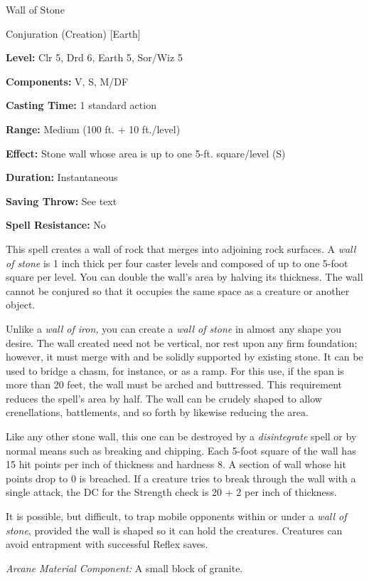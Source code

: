 \documentclass{article}
\begin{document}
\vspace{12pt}
Wall of Stone

Conjuration (Creation) [Earth]

\textbf{Level:} Clr 5, Drd 6, Earth 5, Sor/Wiz 5

\textbf{Components:} V, S, M/DF

\textbf{Casting Time:} 1 standard action

\textbf{Range: }Medium (100 ft. + 10 ft./level)

\textbf{Effect:} Stone wall whose area is up to one 5-ft. square/level (S)

\textbf{Duration:} Instantaneous

\textbf{Saving Throw:} See text

\textbf{Spell Resistance:} No

This spell creates a wall of rock that merges into adjoining rock surfaces. A \textit{wall 
of stone }is 1 inch thick per four caster levels and composed of up to one 5-foot 
square per level. You can double the wall's area by halving its thickness. The 
wall cannot be conjured so that it occupies the same space as a creature or another 
object.

Unlike a \textit{wall of iron, }you can create a \textit{wall of stone }in almost 
any shape you desire. The wall created need not be vertical, nor rest upon any 
firm foundation; however, it must merge with and be solidly supported by existing 
stone. It can be used to bridge a chasm, for instance, or as a ramp. For this use, 
if the span is more than 20 feet, the wall must be arched and buttressed. This 
requirement reduces the spell's area by half. The wall can be crudely shaped to 
allow crenellations, battlements, and so forth by likewise reducing the area.

Like any other stone wall, this one can be destroyed by a \textit{disintegrate 
}spell or by normal means such as breaking and chipping. Each 5-foot square of 
the wall has 15 hit points per inch of thickness and hardness 8. A section of wall 
whose hit points drop to 0 is breached. If a creature tries to break through the 
wall with a single attack, the DC for the Strength check is 20 + 2 per inch of 
thickness.

It is possible, but difficult, to trap mobile opponents within or under a \textit{wall 
of stone}, provided the wall is shaped so it can hold the creatures. Creatures 
can avoid entrapment with successful Reflex saves.

\textit{Arcane Material Component: }A small block of granite.
\end{document}
